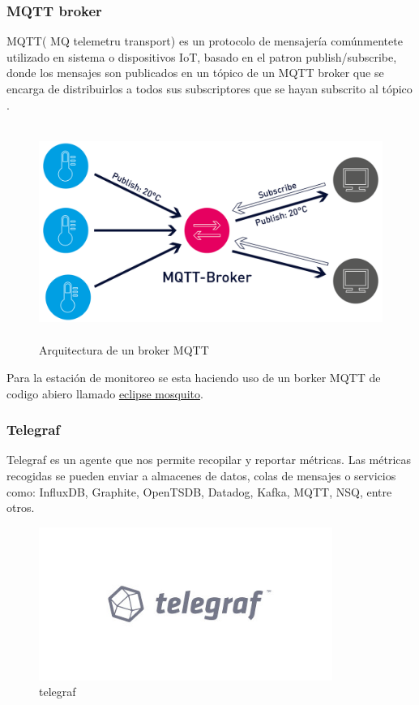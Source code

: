

\subsubsection{MQTT broker}
MQTT( MQ telemetru transport) es un protocolo de mensajería comúnmentete
utilizado en sistema o dispositivos IoT, basado en el patron
publish/subscribe, donde los mensajes son publicados en un tópico de un MQTT
broker que se encarga de distribuirlos a todos sus subscriptores que se hayan
subscrito al tópico . 
\begin{figure}[H]
    \centering
    \includegraphics[width=\textwidth, keepaspectratio,
    height=7cm]{images/mqtt-architecture.png}
    \caption{Arquitectura de un broker MQTT}
    \label{fig:mqtt_arquitecture}
\end{figure}

Para la estación de monitoreo se esta haciendo uso de un borker  MQTT de codigo
abiero llamado \href{http://mosquitto.org}{eclipse mosquito}.

\subsubsection{Telegraf}
Telegraf es un agente que nos permite recopilar y reportar métricas. Las
métricas recogidas se pueden enviar a almacenes de datos, colas de mensajes o
servicios como: InfluxDB, Graphite, OpenTSDB, Datadog, Kafka, MQTT, NSQ, entre
otros.

\begin{figure}[H]
    \centering
    \includegraphics[width=\textwidth, keepaspectratio,
    height=5cm]{images/logo-telegraf-1.jpg}
    \caption{telegraf}
    \label{fig:logo_telegraf}
\end{figure}

